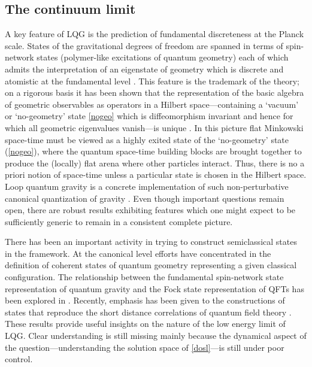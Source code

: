 \documentclass[aps, nofootinbib,superscriptaddress,12pt]{revtex4-2}
\begin{document}
\subsection{The continuum limit}\label{thecontlim}

A key feature of LQG is the prediction of fundamental discreteness at the Planck scale. States of the gravitational degrees of freedom are spanned in terms of spin-network states (polymer-like excitations of quantum geometry) each of which admits the interpretation of an eigenstate of geometry which is discrete and atomistic at the fundamental level \cite{Rovelli:1994ge, Ashtekar:1996eg, Ashtekar:1997fb}. This feature is the trademark of the theory; on a rigorous basis it has been shown that the representation of the basic algebra of geometric observables as operators in a Hilbert space---containing a `vacuum' or `no-geometry' state \eqref{nogeo} which is diffeomorphism invariant and hence for which all geometric eigenvalues vanish---is unique \cite{Lewandowski:2005jk}.  
In this picture flat Minkowski space-time must be viewed as a highly exited state of the `no-geometry' state (\ref{nogeo}), where the quantum space-time building blocks are brought together to produce the (locally) flat arena where other particles interact.  Thus, there is no a priori notion of space-time unless a particular state is chosen in the Hilbert space. 
Loop quantum gravity is a concrete implementation of such non-perturbative canonical quantization of gravity \cite{Rovelli:2004tv, Thiemann:2007zz}.
Even though  important questions remain open, there are robust results exhibiting features which one might expect to be sufficiently generic to remain in a consistent complete picture. 
   
There has been an important activity in trying to construct semiclassical states in the framework. At the canonical level efforts have concentrated in the definition of coherent states of quantum geometry \cite{Thiemann:2000bw, Freidel:2010aq, Livine:2007vk, Rovelli:2010km, Bianchi:2010gc} representing a given classical configuration. The relationship between the fundamental spin-network state representation of quantum gravity and the Fock state representation of QFTs has been explored in \cite{Ashtekar:1992tm, Sahlmann:2002qj, Ashtekar:2001xp,  Conrady:2004ww}. Recently, emphasis has been given to the constructions of states that reproduce the short distance correlations of quantum field theory \cite{Bianchi:2016tmw, Bianchi:2016hmk}.  
These results provide useful insights on the nature of the low energy limit of LQG.  Clear understanding is still missing mainly because the dynamical aspect of the question---understanding the solution space of \eqref{dosl}---is still under poor control.
\end{document}
